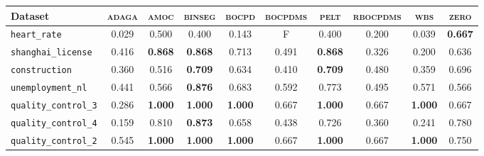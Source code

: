 \begin{tabular}{lccccccccc}
Dataset & \textsc{adaga} & \textsc{amoc} & \textsc{binseg} & \textsc{bocpd} & \textsc{bocpdms} & \textsc{pelt} & \textsc{rbocpdms} & \textsc{wbs} & \textsc{zero}\\
\toprule
\verb+heart_rate+ & 0.029 & 0.500 & 0.400 & 0.143 & F & 0.400 & 0.200 & 0.039 & \textbf{0.667}\\
\verb+shanghai_license+ & 0.416 & \textbf{0.868} & \textbf{0.868} & 0.713 & 0.491 & \textbf{0.868} & 0.326 & 0.200 & 0.636\\
\verb+construction+ & 0.360 & 0.516 & \textbf{0.709} & 0.634 & 0.410 & \textbf{0.709} & 0.480 & 0.359 & 0.696\\
\verb+unemployment_nl+ & 0.441 & 0.566 & \textbf{0.876} & 0.683 & 0.592 & 0.773 & 0.495 & 0.571 & 0.566\\
\verb+quality_control_3+ & 0.286 & \textbf{1.000} & \textbf{1.000} & \textbf{1.000} & 0.667 & \textbf{1.000} & 0.667 & \textbf{1.000} & 0.667\\
\verb+quality_control_4+ & 0.159 & 0.810 & \textbf{0.873} & 0.658 & 0.438 & 0.726 & 0.360 & 0.241 & 0.780\\
\midrule
\verb+quality_control_2+ & 0.545 & \textbf{1.000} & \textbf{1.000} & \textbf{1.000} & 0.667 & \textbf{1.000} & 0.667 & \textbf{1.000} & 0.750\\
\bottomrule
\end{tabular}
